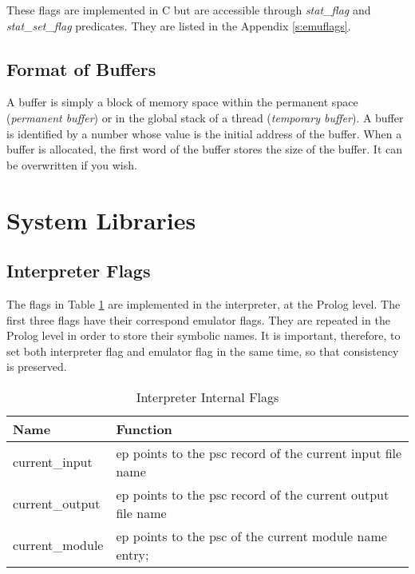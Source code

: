 \documentclass[11pt]{article}
\begin{document}
These flags are implemented in C but are accessible through {\it stat\_flag}
and {\it stat\_set\_flag} predicates. They are listed in the Appendix
\ref{s:emuflags}.


\subsection{Format of Buffers}


A buffer is simply a block of memory space within the permanent
space ({\it permanent buffer}) or in the global stack of a thread
({\it temporary buffer}). A buffer is identified by a number
whose value is the initial address of the buffer.
When a buffer is allocated,
the first word of the buffer stores the size of the buffer. 
It can be overwritten if you wish.










\section{System Libraries} \label{sec:libs}

\subsection{Interpreter Flags}

The flags in Table \ref{t:interpflag} are implemented in the
interpreter, at the Prolog level. The first three flags have their
correspond emulator flags. They are repeated in the Prolog level in order
to store their symbolic names. It is important, therefore, to set
both interpreter flag and emulator flag in the same time, so that
consistency is preserved.

\begin{table}\centering
\begin{tabular}{l|l}
\hline
Name                &  Function \\
\hline
current\_input  & ep points to the psc record of the current input file name\\
current\_output & ep points to the psc record of the current output file name\\
current\_module & ep points to the psc of the current module name entry; \\
\hline
\end{tabular}
\caption{Interpreter Internal Flags}
\label{t:interpflag}
\end{table}
\end{document}
